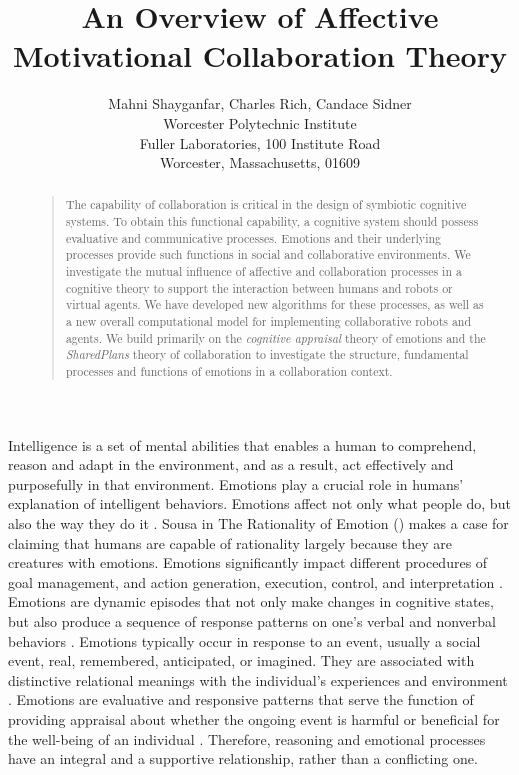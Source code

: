 \documentclass[letterpaper]{article}
\begin{document}
%
\title{An Overview of Affective Motivational Collaboration Theory}
\author{Mahni Shayganfar, Charles Rich, Candace Sidner\\
Worcester Polytechnic Institute\\
Fuller Laboratories, 100 Institute Road\\
Worcester, Massachusetts, 01609\\
}
\maketitle
\begin{abstract}
\begin{quote}
The capability of collaboration is critical in the design of symbiotic cognitive
systems. To obtain this functional capability, a cognitive system should possess
evaluative and communicative processes. Emotions and their underlying processes
provide such functions in social and collaborative environments. We investigate
the mutual influence of affective and collaboration processes in a cognitive
theory to support the interaction between humans and robots or virtual agents.
We have developed new algorithms for these processes, as well as a new overall
computational model for implementing collaborative robots and agents. We build
primarily on the \textit{cognitive appraisal} theory of emotions and the
\textit{SharedPlans} theory of collaboration to investigate the structure,
fundamental processes and functions of emotions in a collaboration context.
\end{quote}
\end{abstract}

Intelligence is a set of mental abilities that enables a human to comprehend,
reason and adapt in the environment, and as a result, act effectively and
purposefully in that environment. Emotions play a crucial role in humans'
explanation of intelligent behaviors. Emotions affect not only what people do,
but also the way they do it \cite{cowie:concepts-definitions}. Sousa in The
Rationality of Emotion (\citeyear{sousa:rationality-emotion}) makes a case for
claiming that humans are capable of rationality largely because they are
creatures with emotions. Emotions significantly impact different procedures of
goal management, and action generation, execution, control, and interpretation
\cite{zhu:emotion-action}. Emotions are dynamic episodes that not only make
changes in cognitive states, but also produce a sequence of response patterns on
one's verbal and nonverbal behaviors \cite{scherer:expression-appraisal}.
Emotions typically occur in response to an event, usually a social event, real,
remembered, anticipated, or imagined. They are associated with distinctive
relational meanings with the individual's experiences and environment
\cite{parkinson:holds-emotion}. Emotions are evaluative and responsive patterns
that serve the function of providing appraisal about whether the ongoing event
is harmful or beneficial for the well-being of an individual
\cite{zhu:emotion-action}. Therefore, reasoning and emotional processes have an
integral and a supportive relationship, rather than a conflicting one.
\end{document}
